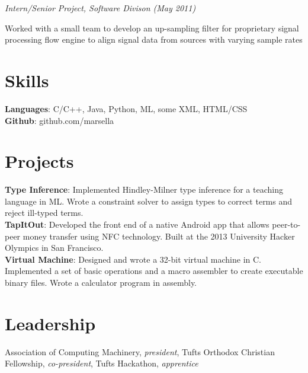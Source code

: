 \documentclass{article}
\newcommand{\position}[2]{
  \textit{#1 (#2)}
}
\newenvironment{achievements}{
  \begin{compactitem} }{
  \end{compactitem}
}
\newcommand{\skill}[2]{
  \textbf{#1}: #2
}
\begin{document}
    \position {Intern/Senior Project, Software Divison} {May 2011}
    \begin{achievements}
      \item Worked with a small team to develop an up-sampling filter for
      proprietary signal processing flow engine to align signal data from sources
      with varying sample rates
    \end{achievements}

\section*{Skills}
  \skill{Languages} {C/C++, Java, Python, ML, some XML, HTML/CSS} \\
  \skill{Github}    {github.com/marsella}

\section*{Projects}
  \skill{Type Inference}
        {Implemented Hindley-Milner type inference for a teaching language in
        ML. Wrote a constraint solver to assign types to correct terms and
        reject ill-typed terms.} \\
        
  \skill{TapItOut}
        {Developed the front end of a native Android app that allows
        peer-to-peer money transfer using NFC technology. Built at the 2013
        University Hacker Olympics in San Francisco.} \\

  \skill{Virtual Machine}
        {Designed and wrote a 32-bit virtual machine in C. Implemented a set of
        basic operations and a macro assembler to create executable binary
        files. Wrote a calculator program in assembly.}

\section*{Leadership}
  Association of Computing Machinery, \textit{president}, Tufts Orthodox
  Christian Fellowship, \textit{co-president}, Tufts Hackathon,
  \textit{apprentice}
\end{document}
